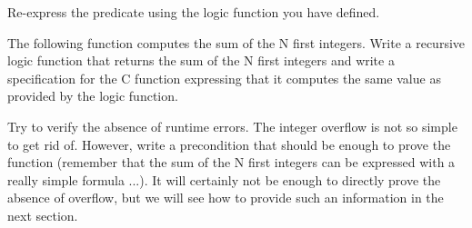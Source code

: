 


Re-express the  predicate using the logic function you
have defined.




\label{l4:acsl-properties-functions-n-first-ints}


The following function computes the sum of the N first integers. Write a
recursive logic function that returns the sum of the N first integers and
write a specification for the C function expressing that it computes the same
value as provided by the logic function.




Try to verify the absence of runtime errors. The integer overflow is not so
simple to get rid of. However, write a precondition that should be enough to
prove the function (remember that the sum of the N first integers can be
expressed with a really simple formula ...). It will certainly not be enough
to directly prove the absence of overflow, but we will see how to provide such
an information in the next section.


